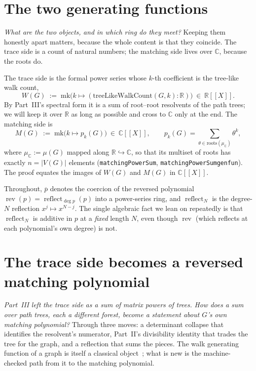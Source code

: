 \documentclass[11pt]{article}
\newcommand{\lean}[1]{{\def\_{\textunderscore\allowbreak}\texttt{#1}}}
\newcommand{\R}{\mathbb{R}}
\newcommand{\C}{\mathbb{C}}
\DeclareMathOperator{\reflect}{reflect}
\DeclareMathOperator{\rev}{rev}
\providecommand{\llbracket}{[\![}
\providecommand{\rrbracket}{]\!]}
\begin{document}
\section{The two generating functions}
\label{sec:objects}

\emph{What are the two objects, and in which ring do they meet?} Keeping them honestly apart matters,
because the whole content is that they coincide. The trace side is a count of natural numbers; the
matching side lives over $\C$, because the roots do.

The trace side is the formal power series whose $k$-th coefficient is the tree-like walk count,
\[
  W(G)\;:=\;\mathrm{mk}\bigl(k\mapsto(\mathrm{treeLikeWalkCount}(G,k):\R)\bigr)\ \in\ \R\llbracket X\rrbracket .
\]
By Part~III's spectral form it is a sum of root--root resolvents of the path trees; we will keep it
over $\R$ as long as possible and cross to $\C$ only at the end. The matching side is
\[
  M(G)\;:=\;\mathrm{mk}\bigl(k\mapsto p_k(G)\bigr)\ \in\ \C\llbracket X\rrbracket,
  \qquad p_k(G)=\sum_{\theta\in\mathrm{roots}(\mu_\C)}\theta^{k},
\]
where $\mu_\C:=\mu(G)$ mapped along $\R\hookrightarrow\C$, so that its multiset of roots has exactly
$n=|V(G)|$ elements (\lean{matchingPowerSum}, \lean{matchingPowerSum\_genfun}). The proof equates the
images of $W(G)$ and $M(G)$ in $\C\llbracket X\rrbracket$.

Throughout, $\overline{p}$ denotes the coercion of the reversed polynomial $\rev(p)=\reflect_{\deg
p}(p)$ into a power-series ring, and $\reflect_N$ is the degree-$N$ reflection
$x^j\mapsto x^{N-j}$. The single algebraic fact we lean on repeatedly is that $\reflect_N$ is
additive in $p$ at a \emph{fixed} length $N$, even though $\rev$ (which reflects at each polynomial's
own degree) is not.

\section{The trace side becomes a reversed matching polynomial}
\label{sec:trace}

\emph{Part~III left the trace side as a sum of matrix powers of trees. How does a sum over path
trees, each a different forest, become a statement about $G$'s own matching polynomial?} Through three
moves: a determinant collapse that identifies the resolvent's numerator, Part~II's divisibility
identity that trades the tree for the graph, and a reflection that sums the pieces. The walk
generating function of a graph is itself a classical object~\cite{GodsilMoments}; what is new is the
machine-checked path from it to the matching polynomial.
\end{document}
